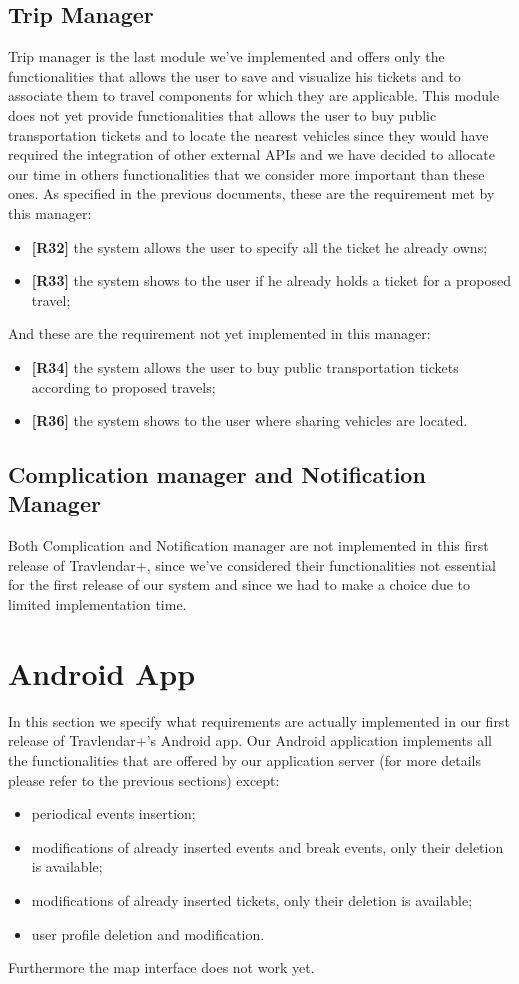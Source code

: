 \subsection{Trip Manager}
Trip manager is the last module we've implemented and offers only the functionalities that allows the user to save and visualize his tickets and to associate them to travel components for which they are applicable.
This module does not yet provide functionalities that allows the user to buy public transportation tickets and to locate the nearest vehicles since they would have required the integration of other external APIs and we have decided to allocate our time in others functionalities that we consider more important than these ones.
As specified in the previous documents, these are the requirement met by this manager:
\begin{itemize}
	\item \textbf{[R32]} the system allows the user to specify all the ticket he already owns;
	\item \textbf{[R33]} the system shows to the user if he already holds a ticket for a proposed travel;
\end{itemize}
And these are the requirement not yet implemented in this manager:
\begin{itemize}
	\item \textbf{[R34]} the system allows the user to buy public transportation tickets according to proposed travels;
	\item \textbf{[R36]} the system shows to the user where sharing vehicles are located.
\end{itemize}

\subsection{Complication manager and Notification Manager}
Both Complication and Notification manager are not implemented in this first release of Travlendar+, since we've considered their functionalities not essential for the  first release of our system and since we had to make a choice due to limited implementation time. 

\section{Android App}
\label{sec:AndroidApp}
In this section we specify what requirements are actually implemented in our first release of Travlendar+'s Android app.
Our Android application implements all the functionalities that are offered by our application server (for more details please refer to the previous sections) except: 
\begin{itemize}
	\item periodical events insertion;
	\item modifications of already inserted events and break events, only their deletion is available;
	\item modifications of already inserted tickets, only their deletion is available;
	\item user profile deletion and modification.
\end{itemize}
Furthermore the map interface does not work yet.

